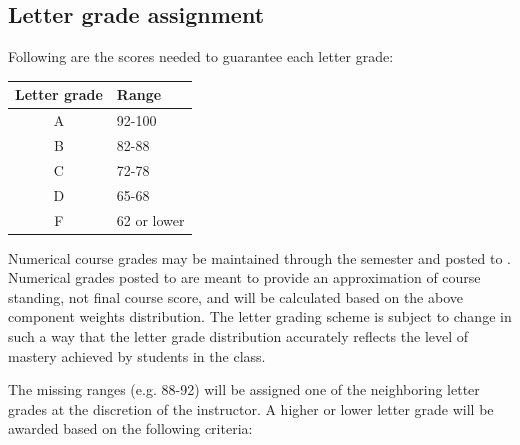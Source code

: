 \subsection*{Letter grade assignment}

\noindent Following are the scores needed to guarantee each letter grade:
\vspace{\baselineskip}

\noindent
\begin{tabular}{cl}
\textbf{Letter grade} & \textbf{Range}       \\ \hline
A            & 92-100      \\
B            & 82-88       \\
C            & 72-78       \\
D            & 65-68       \\
F            & 62 or lower
\end{tabular}%

\vspace{\baselineskip}
Numerical course grades may be maintained through the semester and posted to {\lms}.  Numerical grades posted to {\lms} are meant to provide an approximation of course standing, not final course score, and will be calculated based on the above component weights distribution. The letter grading scheme is subject to change in such a way that the letter grade distribution accurately reflects the level of mastery achieved by students in the class.

The missing ranges (e.g. 88-92) will be assigned one of the neighboring letter grades at the discretion of the instructor. A higher or lower letter grade will be awarded based on the following criteria: